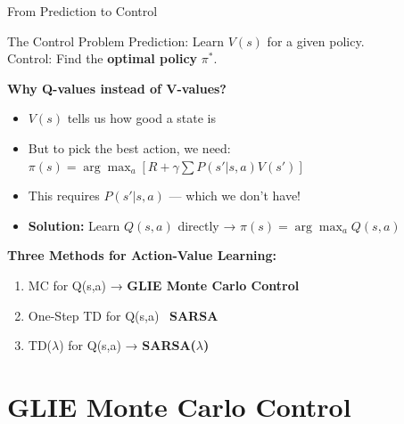 \documentclass[aspectratio=169]{beamer}
\begin{document}
\begin{frame}{From Prediction to Control}
    \begin{block}{The Control Problem}
        Prediction: Learn $V(s)$ for a given policy.\\
        Control: Find the \textbf{optimal policy} $\pi^*$.
    \end{block}

    \vspace{0.3cm}

    \textbf{Why Q-values instead of V-values?}
    \begin{itemize}
        \item $V(s)$ tells us how good a state is
        \item But to pick the best action, we need: $\pi(s) = \arg\max_a [R + \gamma \sum P(s'|s,a) V(s')]$
        \item This requires $P(s'|s,a)$ — which we don't have!
        \item \textbf{Solution:} Learn $Q(s,a)$ directly → $\pi(s) = \arg\max_a Q(s,a)$
    \end{itemize}

    \vspace{0.3cm}

    \textbf{Three Methods for Action-Value Learning:}
    \begin{enumerate}
        \item MC for Q(s,a) → \textbf{GLIE Monte Carlo Control}
        \item One-Step TD for Q(s,a) \textrightarrow\ \textbf{SARSA}
        \item TD($\lambda$) for Q(s,a) → \textbf{SARSA($\lambda$)}
    \end{enumerate}
\end{frame}

\section{GLIE Monte Carlo Control}
\end{document}
